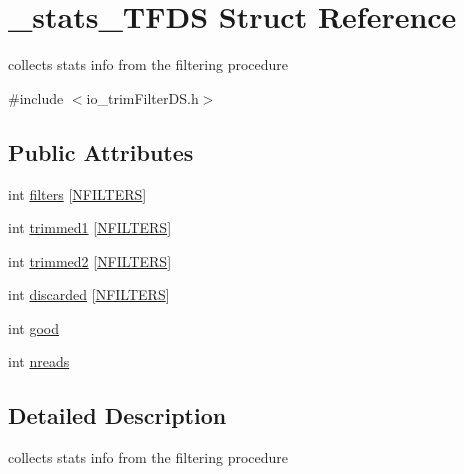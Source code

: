 \hypertarget{struct__stats__TFDS}{\section{\+\_\+stats\+\_\+\+T\+F\+D\+S Struct Reference}
\label{struct__stats__TFDS}
}


collects stats info from the filtering procedure  




{\ttfamily \#include $<$io\+\_\+trim\+Filter\+D\+S.\+h$>$}

\subsection*{Public Attributes}
\begin{DoxyCompactItemize}
\item 
int \hyperlink{struct__stats__TFDS_a8272cc0b600f4d7bd8e61f7d22afff50}{filters} \mbox{[}\hyperlink{defines_8h_a23f1103d8247781ab0be4b0fba2f085f}{N\+F\+I\+L\+T\+E\+R\+S}\mbox{]}
\item 
int \hyperlink{struct__stats__TFDS_a1b6637f8d945758c920ea95107a10379}{trimmed1} \mbox{[}\hyperlink{defines_8h_a23f1103d8247781ab0be4b0fba2f085f}{N\+F\+I\+L\+T\+E\+R\+S}\mbox{]}
\item 
int \hyperlink{struct__stats__TFDS_ac83a1c0eb87d51443fe75ce235047af8}{trimmed2} \mbox{[}\hyperlink{defines_8h_a23f1103d8247781ab0be4b0fba2f085f}{N\+F\+I\+L\+T\+E\+R\+S}\mbox{]}
\item 
int \hyperlink{struct__stats__TFDS_a1a48e89c58bc7216e40eda1828585512}{discarded} \mbox{[}\hyperlink{defines_8h_a23f1103d8247781ab0be4b0fba2f085f}{N\+F\+I\+L\+T\+E\+R\+S}\mbox{]}
\item 
int \hyperlink{struct__stats__TFDS_a2f3493a18118ed55ef04435439b9f0bd}{good}
\item 
int \hyperlink{struct__stats__TFDS_ab49cef985df92c496c0c673d32ec74c4}{nreads}
\end{DoxyCompactItemize}


\subsection{Detailed Description}
collects stats info from the filtering procedure 

